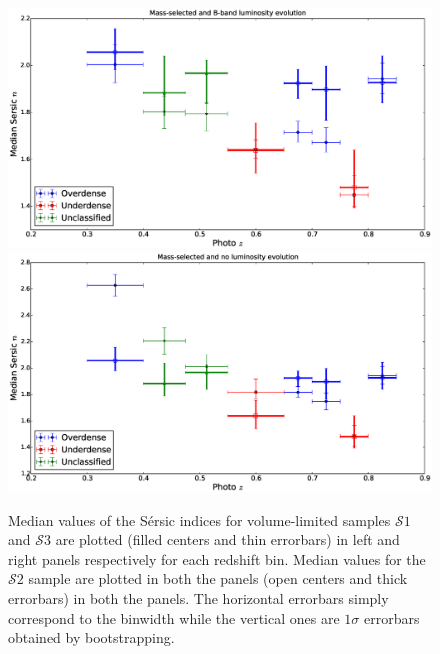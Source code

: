 \documentclass[twocolumn,useAMS,usenatbib]{mn2e}
\newcommand{\sersic}{S\'{e}rsic }
\newcommand{\s}{\ensuremath{\mathcal{S}}}
\begin{document}
\begin{figure}
 \centering
 \includegraphics[width=\columnwidth]{median_sersicn}
 \includegraphics[width=\columnwidth]{median_sersicn(2)}
 \caption{Median values of the \sersic indices for volume-limited samples \s$1$ and \s$3$ are plotted (filled centers and thin errorbars) in left and right panels respectively for each redshift bin.
          Median values for the \s$2$ sample are plotted in both the panels (open centers and thick errorbars) in both the panels.
          The horizontal errorbars simply correspond to the binwidth while the vertical ones are $1\sigma$ errorbars obtained by bootstrapping.}
 \label{fig:median_sersicn}
\end{figure}
\end{document}
